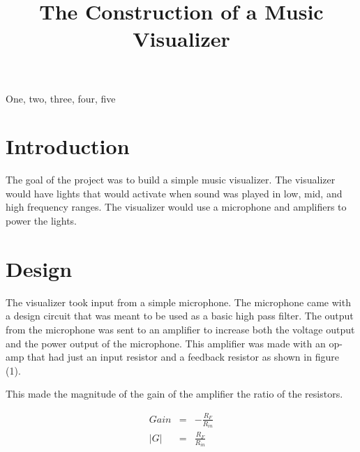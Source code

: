 \documentclass{article}
\begin{document}
\sloppy

\def\x{{\mathbf x}}
\def\L{{\cal L}}


\title{The Construction of a Music Visualizer}
%


\address{}


\maketitle


\begin{abstract}

\end{abstract}
%
\begin{keywords}
One, two, three, four, five
\end{keywords}
%
\section{Introduction}
\label{sec:intro}

The goal of the project was to build a simple music visualizer. The visualizer would have lights that would activate when sound was played in low, mid, and high frequency ranges. The visualizer would use a microphone and amplifiers to power the lights.

\section{Design}
The visualizer took input from a simple microphone. The microphone came with a design circuit that was meant to be used as a basic high pass filter. The output from the microphone was sent to an amplifier to increase both the voltage output and the power output of the microphone. This amplifier was made with an op-amp that had just an input resistor and a feedback resistor as shown in figure (1).


This made the magnitude of the gain of the amplifier the ratio of the resistors.

\begin{eqnarray}
Gain &=& -\frac{R_F}{R_{in}} \nonumber \\
|G| &=& \frac{R_F}{R_{in}} 
\end{eqnarray}
\end{document}
